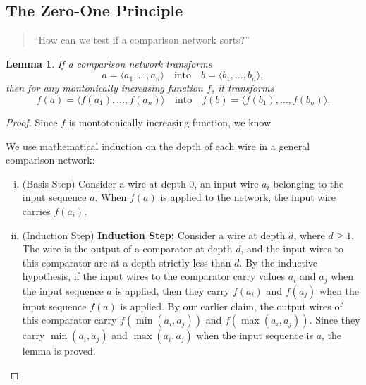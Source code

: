 \documentclass[12pt,openany]{book}
\newtheorem{lemma}[theorem]{Lemma}
\theoremstyle{definition}
\begin{document}
	\subsection{The Zero-One Principle}
	\begin{quote}
		``How can we test if a comparison network sorts?''
	\end{quote}
	\vspace{8pt}
	\begin{tcolorbox}[colframe=lemcolor,title={\color{white}\bf }]
		\begin{lemma}
			If a comparison network transforms \[
			a=\langle a_1,\dots,a_n\rangle\quad\text{into}\quad b=\langle b_1,\dots,b_n\rangle,
			\] then for any montonically increasing function \(f\), it transforms \[
			f(a)=\langle f(a_1),\dots,f(a_n)\rangle\quad\text{into}\quad f(b)=\langle f(b_1),\dots,f(b_n)\rangle.
			\]
		\end{lemma}
	\end{tcolorbox}
	\begin{proof}
		Since \(f\) is montotonically increasing function, we know \begin{center}
		\end{center} We use mathematical induction on the depth of each wire in a general comparison network: \begin{enumerate}[(i)]
		\item (Basis Step) Consider a wire at depth 0, an input wire \( a_i \) belonging to the input sequence \( a \). When \( f(a) \) is applied to the network, the input wire carries \( f(a_i) \).
		\item (Induction Step) \textbf{Induction Step:} Consider a wire at depth \( d \), where \( d \geq 1 \). The wire is the output of a comparator at depth \( d \), and the input wires to this comparator are at a depth strictly less than \( d \). By the inductive hypothesis, if the input wires to the comparator carry values \( a_i \) and \( a_j \) when the input sequence \( a \) is applied, then they carry \( f(a_i) \) and \( f(a_j) \) when the input sequence \( f(a) \) is applied. By our earlier claim, the output wires of this comparator carry \( f(\min(a_i, a_j)) \) and \( f(\max(a_i, a_j)) \). Since they carry \( \min(a_i, a_j) \) and \( \max(a_i, a_j) \) when the input sequence is \( a \), the lemma is proved.
	\end{enumerate}
	\end{proof}
\end{document}
